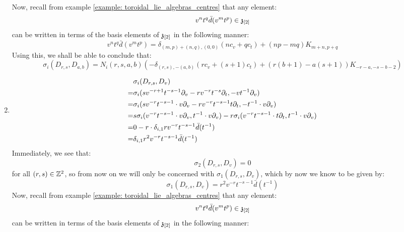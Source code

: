 \begin{example}
\begin{enumerate}
                Now, recall from example \ref{example: toroidal_lie_algebras_centres} that any element:
                    $$v^n t^q \bar{d}(v^m t^p) \in \mathfrak{z}_{[2]}$$
                can be written in terms of the basis elements of $\mathfrak{z}_{[2]}$ in the following manner:
                    $$v^n t^q \bar{d}(v^m t^p) = \delta_{(m, p) + (n, q), (0, 0)} ( n c_v + q c_t ) + (np - mq) K_{m + n, p + q}$$
                Using this, we shall be able to conclude that:
                    $$\sigma_i(D_{r, s}, D_{a, b}) = N_i(r, s, a, b) \left( -\delta_{(r, s), -(a, b)} (r c_v + (s + 1) c_t) + ( r(b + 1) - a(s + 1) )K_{-r - a, -s - b - 2} \right)$$
                \item
                    $$
                        \begin{aligned}
                            & \sigma_i(D_{r, s}, D_v)
                            \\
                            = & \sigma_i( s v^{-r + 1} t^{-s - 1} \partial_v - r v^{-r} t^{-s} \partial_t, -v t^{-1} \partial_v )
                            \\
                            = & \sigma_i( s v^{-r} t^{-s - 1} \cdot v \partial_v - r v^{-r} t^{-s - 1} t \partial_t, -t^{-1} \cdot v \partial_v )
                            \\
                            = & s \sigma_i( v^{-r} t^{-s - 1} \cdot v \partial_v, t^{-1} \cdot v \partial_v ) - r\sigma_i( v^{-r} t^{-s - 1} \cdot t \partial_t, t^{-1} \cdot v \partial_v )
                            \\
                            = & 0 - r \cdot \delta_{i, 1}r v^{-r} t^{-s - 1} \bar{d}(t^{-1})
                            \\
                            = & \delta_{i, 1} r^2 v^{-r} t^{-s - 1} \bar{d}(t^{-1})
                        \end{aligned}
                    $$
                Immediately, we see that:
                    $$\sigma_2(D_{r, s}, D_v) = 0$$
                for all $(r, s) \in \mathbb{Z}^2$, so from now on we will only be concerned with $\sigma_1(D_{r, s}, D_v)$, which by now we know to be given by:
                    $$\sigma_1(D_{r, s}, D_v) = r^2 v^{-r} t^{-s - 1} \bar{d}(t^{-1})$$
                Now, recall from example \ref{example: toroidal_lie_algebras_centres} that any element:
                    $$v^n t^q \bar{d}(v^m t^p) \in \mathfrak{z}_{[2]}$$
                can be written in terms of the basis elements of $\mathfrak{z}_{[2]}$ in the following manner:

\end{enumerate}
\end{example}
